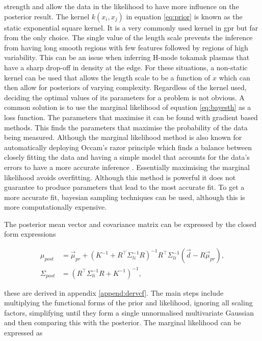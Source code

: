 strength and allow the data in the likelihood to have more influence on the posterior result. The kernel $k(x_i,x_j)$ in equation \ref{eq:prior} is known as the static exponential square kernel. It is a very commonly used kernel in \gls{gpr} but far from the only choice. The single value of the length scale prevents the inference from having long smooth regions with few features followed by regions of high variability. This can be an issue when inferring H-mode tokamak plasmas that have a sharp drop-off in density at the edge. For these situations, a non-static kernel can be used that allows the length scale to be a function of $x$ which can then allow for posteriors of varying complexity. Regardless of the kernel used, deciding the optimal values of its parameters for a problem is not obvious. A common solution is to use the marginal likelihood of equation \ref{eq:bayesth} as a loss function. The parameters that maximise it can be found with gradient based methods. This finds the parameters that maximise the probability of the data being measured. Although the marginal likelihood method is also known for automatically deploying Occam's razor principle which finds a balance between closely fitting the data and having a simple model that accounts for the data's errors to have a more accurate inference \cite{oscraz} \cite{gp4ml}. Essentially maximising the marginal likelihood avoids overfitting. Although this method is powerful it does not guarantee to produce parameters that lead to the most accurate fit. To get a more accurate fit, bayesian sampling techniques can be used, although this is more computationally expensive. 

The posterior mean vector and covariance matrix can be expressed by the closed form expressions

\begin{align}
\label{eq:mupost}
\mu_{post} &= \vec{\mu}_{pr} + (K^{-1} + R^{\top} \Sigma_{li}^{-1} R)^{-1} R^{\top} \Sigma_{li}^{-1} (\vec{d} - R \vec{\mu}_{pr}),\\
\label{eq:covpost}
\Sigma_{post} &= \left(R^\top \Sigma_{li}^{-1} R + K^{-1}\right)^{-1},
\end{align}

\noindent these are derived in appendix \ref{append:dervcf}. The main steps include multiplying the functional forms of the prior and likelihood, ignoring all scaling factors, simplifying until they form a single unnormalised multivariate Gaussian and then comparing this with the posterior. The marginal likelihood can be expressed as

